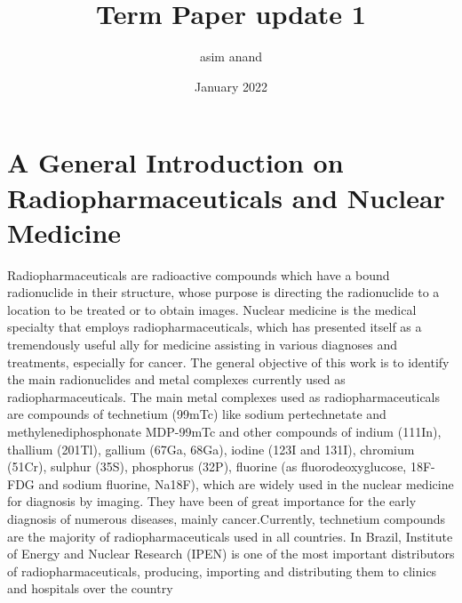 \documentclass{article}
\title{Term Paper update 1}
\author{asim anand}
\date{January 2022}
\begin{document}
\maketitle

\section{A General Introduction on Radiopharmaceuticals and Nuclear Medicine}
Radiopharmaceuticals are radioactive compounds which  have  a  bound  radionuclide  in  their  structure,  whose purpose is directing the radionuclide to a location to be treated or to obtain images. Nuclear medicine is the medical specialty that employs radiopharmaceuticals, which has presented itself as a tremendously  useful  ally  for  medicine  assisting  in  various diagnoses  and  treatments,  especially  for  cancer.  The  general objective of this work is to identify the main radionuclides and metal  complexes  currently  used  as  radiopharmaceuticals.  The main  metal  complexes  used  as  radiopharmaceuticals  are compounds of technetium (99mTc) like sodium pertechnetate and methylenediphosphonate  MDP-99mTc and  other  compounds  of indium (111In), thallium (201Tl), gallium (67Ga, 68Ga), iodine (123I and  131I),  chromium  (51Cr),  sulphur  (35S),  phosphorus  (32P), fluorine (as  fluorodeoxyglucose, 18F-FDG and  sodium fluorine, Na18F),  which  are  widely  used  in  the  nuclear  medicine  for diagnosis by imaging. They have been of great importance for the early diagnosis of numerous diseases, mainly cancer.Currently, technetium compounds are the majority of radiopharmaceuticals used in all  countries.  In  Brazil,  Institute  of  Energy  and  Nuclear  Research  (IPEN)  is  one  of  the  most  important  distributors  of radiopharmaceuticals, producing, importing and distributing them to clinics and hospitals over the country
\end{document}
